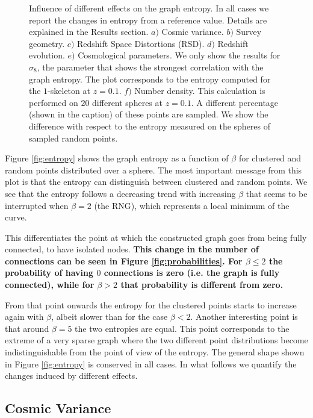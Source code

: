 \documentclass[fleqn,usenatbib]{mnras}
\begin{document}
\begin{figure}
    \caption{Influence of different effects on the graph entropy. In all cases we 
    report the changes in entropy from a reference value. 
    Details are explained in the Results section. $a)$ Cosmic variance. 
    $b)$ Survey geometry. 
    $c)$ Redshift Space Distortions (RSD).
    $d)$ Redshift evolution.
    $e)$ Cosmological parameters. We only show the results for $\sigma_8$, 
    the parameter that shows the strongest correlation with the graph entropy.
    The plot corresponds to the entropy computed for the $1$-skeleton at $z=0.1$. 
    $f)$ Number density. 
    This calculation is performed on $20$ different spheres at $z=0.1$.
    A different percentage (shown in the caption) of these points are sampled. 
    We show the difference with respect to the entropy measured on the spheres 
    of sampled random points.\label{fig:diferencias}}
\end{figure}    



Figure \ref{fig:entropy} shows the graph entropy as a function of $\beta$ for
clustered and random points distributed over a sphere.
The most important message from this plot is that the entropy can distinguish between
clustered and random points.
We see that the entropy follows a decreasing trend with increasing
$\beta$ that seems to be interrupted when $\beta=2$ (the RNG), which
represents a local minimum of the curve.  

This differentiates the point at which the constructed graph goes from
being fully connected, to have isolated nodes.
\textbf{This change in the number of connections can be seen
  in Figure \ref{fig:probabilities}.
For $\beta\leq 2$ the probability of having $0$ connections is zero
(i.e. the graph is fully connected), while for $\beta>2$ that
probability is different from zero.}

From that point onwards the entropy for the clustered points starts to
increase again with $\beta$, albeit slower than for the case
$\beta<2$. 
Another interesting point is that around $\beta=5$ the two entropies are equal. 
This point corresponds to the extreme of a very sparse graph where the two different point distributions become indistinguishable from the point of view of the entropy.
The general shape shown in Figure \ref{fig:entropy} is conserved in all cases. 
In what follows we quantify the changes induced by different effects.

\subsection{Cosmic Variance}
\end{document}
